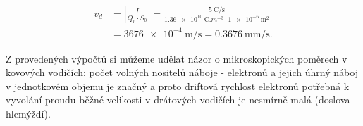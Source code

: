 \begin{mdframed}[style=mdexam]
\begin{example}
\begin{itemize}
    \begin{align*}
      v_d &= \left\lvert\frac{I}{Q_v\cdot S_0}\right\rvert                       
           = \frac{\SI{5}{\coulomb\per\s}}{\SI{1.36e10}{\coulomb.m^{-3}}\cdot\SI{1e-6}{\m^2}}   \\
          &= \SI{3676e-4}{\m\per\s} = \SI{0.3676}{\mm\per\s}.  
    \end{align*}
  \end{itemize}
  Z provedených výpočtů si můžeme udělat názor o mikroskopických poměrech v kovových
  vodičích: počet volných nositelů náboje - elektronů a jejich úhrný náboj v jednotkovém
  objemu je značný a proto driftová rychlost elektronů potřebná k vyvolání proudu běžné
  velikosti v drátových vodičích je nesmírně malá (doslova hlemýždí).
\end{example}  
\end{mdframed}
